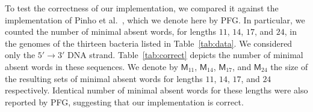 \documentclass{llncs}
\begin{document}
  To test the correctness of our implementation, we compared it against
the implementation of Pinho et al.~\cite{Pinho2009}, which we denote here
by \textsf{PFG}.
  In particular, we counted the number of minimal absent words, for 
lengths $11$, $14$, $17$, and $24$, in the genomes of the thirteen 
bacteria listed in Table~\ref{tab:data}.
  We considered only the $5'\rightarrow3'$ DNA strand. 
  Table~\ref{tab:correct} depicts the number of minimal absent words in 
these sequences. 
  We denote by $\textsf{M}_{11}$, $\textsf{M}_{14}$, $\textsf{M}_{17}$, 
and $\textsf{M}_{24}$ the size of the resulting sets of minimal absent
words for lengths $11$, $14$, $17$, and $24$ respectively. 
  Identical number of minimal absent words for these lengths were also
reported by \textsf{PFG}, suggesting that our implementation is correct.

\begin{table}[!ht]
\vspace{0.25cm}
\begin{center}
\end{center}
\caption{Number of minimal absent words of lengths $11$, $14$, $17$, 
and $24$ in the genomes of thirteen bacteria.}
\label{tab:correct}
\end{table}
\end{document}
